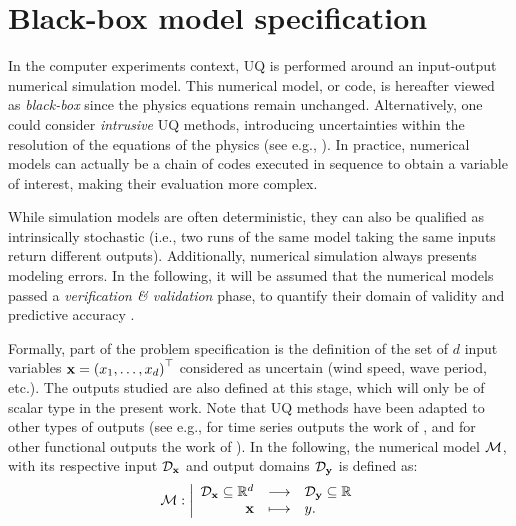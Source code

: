 \section{Black-box model specification} \label{sec:model_spec}
In the computer experiments context, UQ is performed around an input-output numerical simulation model. 
This numerical model, or code, is hereafter viewed as \textit{black-box} since the physics equations remain unchanged. 
Alternatively, one could consider \textit{intrusive} UQ methods, introducing uncertainties within the resolution of the equations of the physics (see e.g., \citealp{lemaitre_2010}). 
In practice, numerical models can actually be a chain of codes executed in sequence to obtain a variable of interest, making their evaluation more complex.

While simulation models are often deterministic, they can also be qualified as intrinsically stochastic (i.e., two runs of the same model taking the same inputs return different outputs).
Additionally, numerical simulation always presents modeling errors. 
In the following, it will be assumed that the numerical models passed a \textit{verification \& validation} phase, to quantify their domain of validity and predictive accuracy \citep{damblin_2015}. 

Formally, part of the problem specification is the definition of the set of $d$ input variables ${\bf x} = \left(x_1, \dots, x_d\right)^\top$ considered as uncertain (wind speed, wave period, etc.). 
The outputs studied are also defined at this stage, which will only be of scalar type in the present work.  
Note that UQ methods have been adapted to other types of outputs (see e.g., for time series outputs the work of \citealp{lataniotis_2019}, and for other functional outputs the work of \citealp{auder_2012,rollon_2021}). 
In the following, the numerical model $\mathcal{M}$, with its respective input $\mathcal{D}_{{\bf x}}$ and output domains $\mathcal{D}_{{\bf y}}$ is defined as:
\begin{equation}
\mathcal{M} : \bigg|
    \begin{array}{rcl}
        \mathcal{D}_{{\bf x}} \subseteq \mathbb{R}^d & \longrightarrow & \mathcal{D}_{{\bf y}} \subseteq \mathbb{R} \\
        {\bf x} & \longmapsto & y.
    \end{array}
    \label{eq:numerical_model}
\end{equation}

